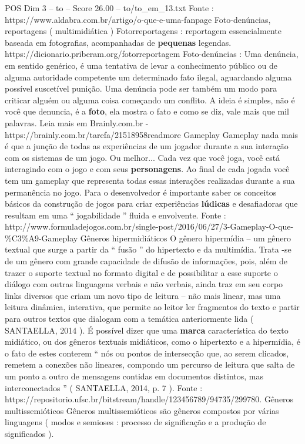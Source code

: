 \begin{textsample}{POS Dim 3 – to – Score 26.00 – to/to\_em\_13.txt}
Fonte : https://www.aldabra.com.br/artigo/o-que-e-uma-fanpage Foto-denúncias, reportagens ( multimidiática ) Fotorreportagens : reportagem essencialmente baseada em fotografias, acompanhadas de \textbf{pequenas} legendas. https://dicionario.priberam.org/fotorreportagem Foto-denúncias : Uma denúncia, em sentido genérico, é uma tentativa de levar a conhecimento público ou de alguma autoridade competente um determinado fato ilegal, aguardando alguma possível suscetível punição.
Uma denúncia pode ser também um modo para criticar alguém ou alguma coisa começando um conflito.
A ideia é simples, não é você que denuncia, é a \textbf{foto}, ela mostra o fato e como se diz, vale mais que mil palavras.
Leia mais em Brainly.com.br - https://brainly.com.br/tarefa/21518958readmore Gameplay Gameplay nada mais é que a junção de todas as experiências de um jogador durante a sua interação com os sistemas de um jogo.
Ou melhor...
Cada vez que você joga, você está interagindo com o jogo e com seus \textbf{personagens}.
Ao final de cada jogada você tem um gameplay que representa todas essas interações realizadas durante a sua permanência no jogo.
Para o desenvolvedor é importante saber os conceitos básicos da construção de jogos para criar experiências \textbf{lúdicas} e desafiadoras que resultam em uma “ jogabilidade ” fluida e envolvente.
Fonte : http://www.formuladejogos.com.br/single-post/2016/06/27/3-Gameplay-O-que-\%C3\%A9-Gameplay Gêneros hipermidiáticos O gênero hipermídia – um gênero textual que surge a partir da “ fusão ” do hipertexto e da multimídia.
Trata -se de um gênero com grande capacidade de difusão de informações, pois, além de trazer o suporte textual no formato digital e de possibilitar a esse suporte o diálogo com outras linguagens verbais e não verbais, ainda traz em seu corpo links diversos que criam um novo tipo de leitura – não mais linear, mas uma leitura dinâmica, interativa, que permite ao leitor ler fragmentos do texto e partir para outros textos que dialogam com a temática anteriormente lida ( SANTAELLA, 2014 ).
É possível dizer que uma \textbf{marca} característica do texto midiático, ou dos gêneros textuais midiáticos, como o hipertexto e a hipermídia, é o fato de estes conterem “ nós ou pontos de intersecção que, ao serem clicados, remetem a conexões não lineares, compondo um percurso de leitura que salta de um ponto a outro de mensagens contidas em documentos distintos, mas interconectados ” ( SANTAELLA, 2014, p. 7 ).
Fonte : https://repositorio.ufsc.br/bitstream/handle/123456789/94735/299780.
Gêneros multissemióticos Gêneros multissemióticos são gêneros compostos por várias linguagens ( modos e semioses : processo de significação e a produção de significados ).

\end{textsample}

